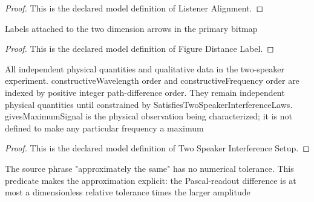 \begin{proof}
  This is the declared model definition of Listener Alignment.
\end{proof}
\begin{definition}
  \label{def:physics:phyx-mini-0314:phyxminiproblems-problemphyxmini0314-figuredistancelabel}
  Labels attached to the two dimension arrows in the primary bitmap
\end{definition}
\begin{proof}
  This is the declared model definition of Figure Distance Label.
\end{proof}
\begin{definition}
  \label{def:physics:phyx-mini-0314:phyxminiproblems-problemphyxmini0314-twospeakerinterferencesetup}
  All independent physical quantities and qualitative data in the two-speaker experiment. constructiveWavelength order and constructiveFrequency order are indexed by positive integer path-difference order. They remain independent physical quantities until constrained by SatisfiesTwoSpeakerInterferenceLaws. givesMaximumSignal is the physical observation being characterized; it is not defined to make any particular frequency a maximum
\end{definition}
\begin{proof}
  This is the declared model definition of Two Speaker Interference Setup.
\end{proof}
\begin{definition}
  \label{def:physics:phyx-mini-0314:phyxminiproblems-problemphyxmini0314-receivedamplitudesapproximatelyequal}
  The source phrase "approximately the same" has no numerical tolerance. This predicate makes the approximation explicit: the Pascal-readout difference is at most a dimensionless relative tolerance times the larger amplitude
\end{definition}
